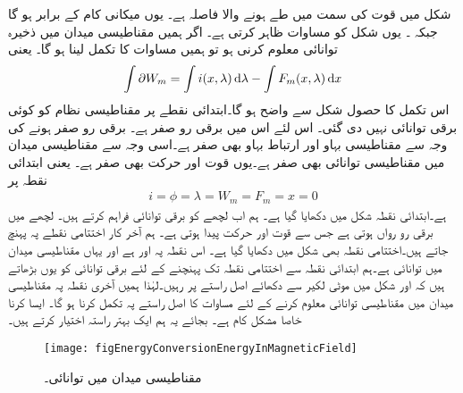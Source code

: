 شکل   میں قوت   کی سمت میں طے ہونے والا فاصلہ  ہے۔ یوں  میکانی کام  کے برابر ہو گا جبکہ  ۔ یوں شکل    کو مساوات   ظاہر کرتی ہے۔ اگر ہمیں مقناطیسی میدان میں ذخیرہ توانائی  معلوم کرنی ہو تو ہمیں مساوات   کا تکمل  لینا ہو گا۔ یعنی
\begin{align}\label{مساوات_تبادلہ_توانائی_تکمل}
\int \partial W_m = \int i(x,\lambda) \dif \lambda-\int F_m(x,\lambda) \dif x
\end{align}
اس تکمل کا حصول شکل    سے واضح ہو گا۔ابتدائی نقطے پر مقناطیسی نظام کو کوئی برقی توانائی نہیں دی گئی۔ اس لئے اس میں  برقی رو صفر ہے۔ برقی رو صفر ہونے کی وجہ سے  مقناطیسی بہاو اور  ارتباط بہاو بھی صفر ہے۔اسی وجہ سے مقناطیسی میدان میں مقناطیسی توانائی بھی صفر ہے۔یوں  قوت اور حرکت بھی صفر ہے۔ یعنی ابتدائی نقطہ پر
\begin{align*}
i=\phi=\lambda=W_m=F_m=x=0
\end{align*}
ہے۔ابتدائی نقطہ شکل   میں دکھایا گیا ہے۔ ہم اب لچھے کو برقی توانائی فراہم کرتے ہیں۔ لچھے میں برقی رو رواں ہوتی ہے جس سے قوت اور حرکت پیدا ہوتی ہے۔ ہم آخر کار  اختتامی نقطے پہ پہنچ جاتے ہیں۔اختتامی نقطہ بھی شکل میں دکھایا گیا ہے۔ اس نقطہ پہ  اور  ہے اور یہاں مقناطیسی میدان میں توانائی  ہے۔ہم ابتدائی نقطہ  سے اختتامی نقطہ  تک پہنچنے کے لئے  برقی توانائی کو یوں بڑھاتے ہیں کہ  اور   شکل   میں موٹی لکیر سے دکھائے اصل راستے پر رہیں۔لہٰذا ہمیں آخری نقطہ پہ مقناطیسی میدان میں مقناطیسی توانائی  معلوم کرنے کے لئے مساوات   کا اصل راستے پہ تکمل کرنا ہو گا۔ ایسا کرنا خاصا مشکل کام ہے۔ بجائے یہ ہم ایک بہتر راستہ اختیار کرتے ہیں۔
\begin{figure}
\centering
\texttt{[image: figEnergyConversionEnergyInMagneticField]}
\caption{مقناطیسی میدان میں توانائی۔}
\label{شکل_تبادلہ_توانائی_مقناطیسی_میدان_میں_توانائی}
\end{figure}


